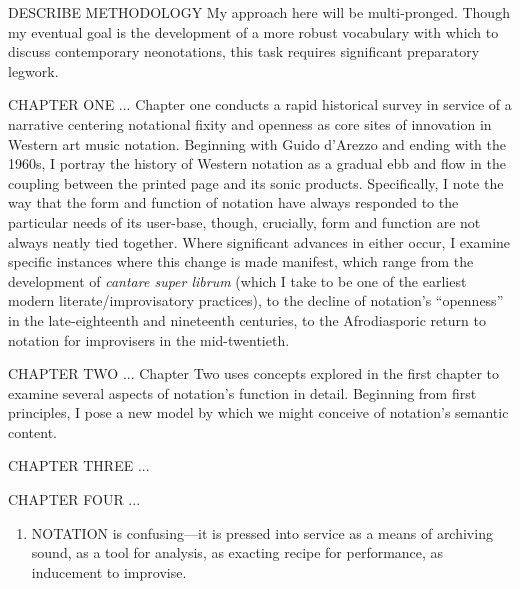 DESCRIBE METHODOLOGY
My approach here will be multi-pronged. Though my eventual goal is the development of a more robust vocabulary with which to discuss contemporary neonotations, this task requires significant preparatory legwork.

CHAPTER ONE ...
Chapter one conducts a rapid historical survey in service of a narrative centering notational fixity and openness as core sites of innovation in Western art music notation. 
Beginning with Guido d'Arezzo and ending with the 1960s, I portray the history of Western notation as a gradual ebb and flow in the coupling between the printed page and its sonic products. 
Specifically, I note the way that the form and function of notation have always responded to the particular needs of its user-base, though, crucially, form and function are not always neatly tied together.
Where significant advances in either occur, I examine specific instances where this change is made manifest, which range from the development of \textit{cantare super librum} (which I take to be one of the earliest modern literate/improvisatory practices), to the decline of notation's ``openness'' in the late-eighteenth and nineteenth centuries, to the Afrodiasporic return to notation for improvisers in the mid-twentieth.

CHAPTER TWO ...
Chapter Two uses concepts explored in the first chapter to examine several aspects of notation's function in detail.
Beginning from first principles, I pose a new model by which we might conceive of notation's semantic content.


CHAPTER THREE ...

CHAPTER FOUR ...

\begin{enumerate}
    \item NOTATION is confusing---it is pressed into service as a means of archiving sound, as a tool for analysis, as exacting recipe for performance, as inducement to improvise.   
\end{enumerate}
